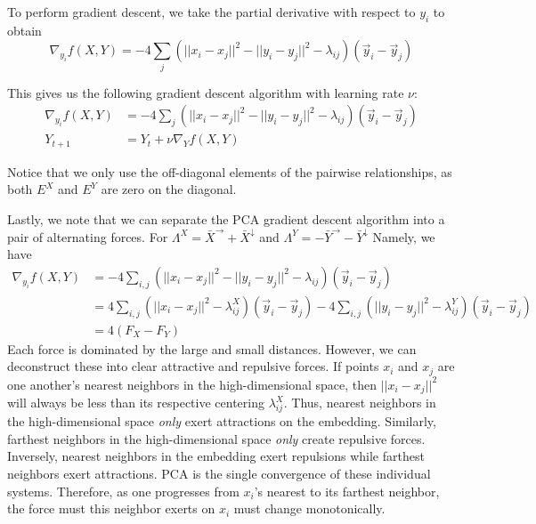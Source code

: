 \documentclass{article}
\theoremstyle{definition}
\begin{document}
To perform gradient descent, we take the partial derivative with respect to $y_i$ to obtain
\[ \nabla_{y_i} f(X, Y) = -4 \sum_{j} (||x_i - x_j||^2 - ||y_i - y_j||^2 - \lambda_{ij}) (\vec{y}_i - \vec{y}_j) \]

This gives us the following gradient descent algorithm with learning rate $\nu$:
\begin{equation*}
    \boxed{
    \begin{aligned}
        \nabla_{y_i} f(X, Y) &= -4 \sum_{j} ( ||x_i - x_j||^2 - ||y_i - y_j||^2 - \lambda_{ij}) (\vec{y}_i - \vec{y}_j) \\
        Y_{t + 1} &= Y_t + \nu \nabla_{Y} f(X, Y)
    \end{aligned}
    }
\end{equation*}

Notice that we only use the off-diagonal elements of the pairwise relationships, as both $E^X$ and $E^Y$ are zero on the diagonal.

Lastly, we note that we can separate the PCA gradient descent algorithm into a pair of alternating forces. For $\Lambda^X = \bar{X}^{\rightarrow}
+ \bar{X}^{\downarrow}$ and $\Lambda^Y = - \bar{Y}^{\rightarrow} - \bar{Y}^{\downarrow}$ Namely, we have
\begin{align*}
    \nabla_{y_i} f(X, Y) &= -4 \sum_{i, j} ( ||x_i - x_j||^2 - ||y_i - y_j||^2 - \lambda_{ij}) (\vec{y}_i - \vec{y}_j) \\
    &= 4 \sum_{i, j} (||x_i - x_j||^2 - \lambda^X_{ij}) (\vec{y}_i - \vec{y}_j) - 4 \sum_{i, j} (||y_i - y_j||^2 - \lambda^Y_{ij})(\vec{y}_i
    - \vec{y}_j) \\
    &= 4 \left( F_{X} - F_{Y} \right)
\end{align*}
Each force is dominated by the large and small distances. However, we can deconstruct these into clear attractive and repulsive forces. If points $x_i$
and $x_j$ are one another's nearest neighbors in the high-dimensional space, then $||x_i - x_j||^2$ will always be less than its respective centering
$\lambda^X_{ij}$. Thus, nearest neighbors in the high-dimensional space \textit{only} exert attractions on the embedding. Similarly, farthest
neighbors in the high-dimensional space \textit{only} create repulsive forces. Inversely, nearest neighbors in the embedding exert repulsions while
farthest neighbors exert attractions. PCA is the single convergence of these individual systems. Therefore, as one progresses from $x_i$'s nearest to its farthest neighbor, the force must this neighbor exerts on $x_i$ must change monotonically.
\end{document}

